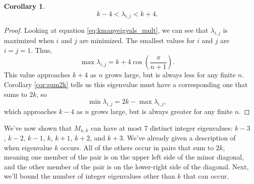 \documentclass[12pt]{article}
\newtheorem{corollary}{Corollary}
\begin{document}
	\begin{corollary}\label{cor:eigvalrange}
		\begin{equation*}
			k-4 < \lambda_{i,j} < k+4.
		\end{equation*}
	\end{corollary}
	\begin{proof}
		Looking at equation \eqref{eq:kmanyeigvals_mult}, we can see that
		$\lambda_{i,j}$ is maximized when $i$ and $j$ are minimized.
		The smallest values for $i$ and $j$ are $i=j=1$.
		Thus,
		\begin{equation*}
			\max{\lambda_{i,j}} = k + 4\cos{\left(\frac{\pi}{n+1}\right)}.
		\end{equation*}
		This value approaches $k+4$ as $n$ grows large, but is always less for any
		finite $n$. 
		Corollary \ref{cor:sum2k} tells us this eigenvalue must have a corresponding
		one that sums to $2k$, so
		\begin{equation*}
			\min{\lambda_{i,j}} = 2k - \max{\lambda_{i,j}},
		\end{equation*}
		which approaches $k-4$ as $n$ grows large, but is always greater for any
		finite $n$.
	\end{proof}
	We've now shown that $M_{n,k}$ can have at most 7 distinct integer eigenvalues:
	$k-3$, $k-2$, $k-1$, $k$, $k+1$, $k+2$, and $k+3$. 
	We've already given a description of when eigenvalue $k$ occurs.
	All of the others occur in pairs that sum to $2k$, meaning one member of the
	pair is on the upper left side of the minor diagonal, and the other member of
	the pair is on the lower-right side of the diagonal.
	Next, we'll bound the number of integer eigenvalues other than $k$ that can
	occur.
	
\end{document}
